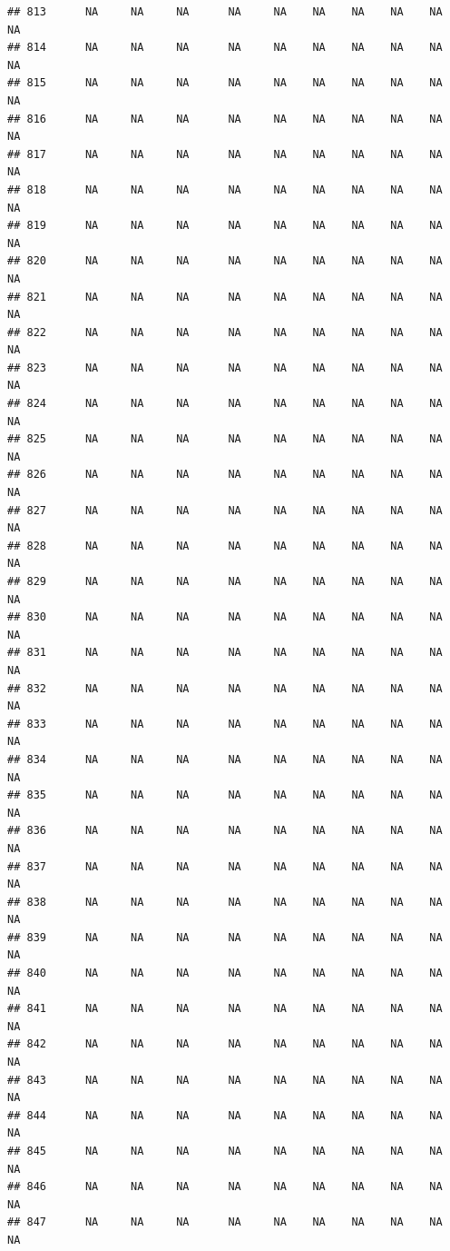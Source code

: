 \documentclass{article}\usepackage{graphicx, color}
\makeatletter
\newenvironment{kframe}{%
 \def\at@end@of@kframe{}%
 \ifinner\ifhmode%
  \def\at@end@of@kframe{\end{minipage}}%
  \begin{minipage}{\columnwidth}%
 \fi\fi%
 \def\FrameCommand##1{\hskip\@totalleftmargin \hskip-\fboxsep
 \colorbox{shadecolor}{##1}\hskip-\fboxsep
     \hskip-\linewidth \hskip-\@totalleftmargin \hskip\columnwidth}%
 \MakeFramed {\advance\hsize-\width
   \@totalleftmargin\z@ \linewidth\hsize
   \@setminipage}}%
 {\par\unskip\endMakeFramed%
 \at@end@of@kframe}
\newenvironment{knitrout}{}{} %
\makeatother
\begin{document}
\begin{knitrout}
\begin{kframe}
\begin{verbatim}
## 813      NA     NA     NA      NA     NA    NA    NA    NA    NA     NA
## 814      NA     NA     NA      NA     NA    NA    NA    NA    NA     NA
## 815      NA     NA     NA      NA     NA    NA    NA    NA    NA     NA
## 816      NA     NA     NA      NA     NA    NA    NA    NA    NA     NA
## 817      NA     NA     NA      NA     NA    NA    NA    NA    NA     NA
## 818      NA     NA     NA      NA     NA    NA    NA    NA    NA     NA
## 819      NA     NA     NA      NA     NA    NA    NA    NA    NA     NA
## 820      NA     NA     NA      NA     NA    NA    NA    NA    NA     NA
## 821      NA     NA     NA      NA     NA    NA    NA    NA    NA     NA
## 822      NA     NA     NA      NA     NA    NA    NA    NA    NA     NA
## 823      NA     NA     NA      NA     NA    NA    NA    NA    NA     NA
## 824      NA     NA     NA      NA     NA    NA    NA    NA    NA     NA
## 825      NA     NA     NA      NA     NA    NA    NA    NA    NA     NA
## 826      NA     NA     NA      NA     NA    NA    NA    NA    NA     NA
## 827      NA     NA     NA      NA     NA    NA    NA    NA    NA     NA
## 828      NA     NA     NA      NA     NA    NA    NA    NA    NA     NA
## 829      NA     NA     NA      NA     NA    NA    NA    NA    NA     NA
## 830      NA     NA     NA      NA     NA    NA    NA    NA    NA     NA
## 831      NA     NA     NA      NA     NA    NA    NA    NA    NA     NA
## 832      NA     NA     NA      NA     NA    NA    NA    NA    NA     NA
## 833      NA     NA     NA      NA     NA    NA    NA    NA    NA     NA
## 834      NA     NA     NA      NA     NA    NA    NA    NA    NA     NA
## 835      NA     NA     NA      NA     NA    NA    NA    NA    NA     NA
## 836      NA     NA     NA      NA     NA    NA    NA    NA    NA     NA
## 837      NA     NA     NA      NA     NA    NA    NA    NA    NA     NA
## 838      NA     NA     NA      NA     NA    NA    NA    NA    NA     NA
## 839      NA     NA     NA      NA     NA    NA    NA    NA    NA     NA
## 840      NA     NA     NA      NA     NA    NA    NA    NA    NA     NA
## 841      NA     NA     NA      NA     NA    NA    NA    NA    NA     NA
## 842      NA     NA     NA      NA     NA    NA    NA    NA    NA     NA
## 843      NA     NA     NA      NA     NA    NA    NA    NA    NA     NA
## 844      NA     NA     NA      NA     NA    NA    NA    NA    NA     NA
## 845      NA     NA     NA      NA     NA    NA    NA    NA    NA     NA
## 846      NA     NA     NA      NA     NA    NA    NA    NA    NA     NA
## 847      NA     NA     NA      NA     NA    NA    NA    NA    NA     NA

\end{verbatim}
\end{kframe}
\end{knitrout}
\end{document}
